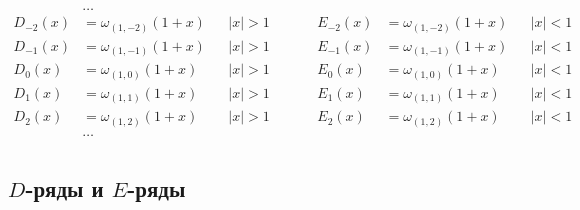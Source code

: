 \begin{equation*} \begin{aligned}
&\ldots \\
D_{-2}(x) &= \omega_{(1,-2)}(1 + x) &
&|x| > 1 &
&\quad &
E_{-2}(x) &= \omega_{(1,-2)}(1 + x) &
&|x| < 1 \\
%
D_{-1}(x) &= \omega_{(1,-1)}(1 + x) &
&|x| > 1 &
&\quad &
E_{-1}(x) &= \omega_{(1,-1)}(1 + x) &
&|x| < 1 \\
%
D_0(x) &= \omega_{(1,0)}(1 + x) &
&|x| > 1 &
&\quad &
E_0(x) &= \omega_{(1,0)}(1 + x) &
&|x| < 1 \\
%
D_1(x) &= \omega_{(1,1)}(1 + x) &
&|x| > 1 &
&\quad &
E_1(x) &= \omega_{(1,1)}(1 + x) &
&|x| < 1 \\
%
D_2(x) &= \omega_{(1,2)}(1 + x) &
&|x| > 1 &
&\quad &
E_2(x) &= \omega_{(1,2)}(1 + x) &
&|x| < 1 \\
%
&\ldots \\
\end{aligned} \end{equation*}

\subsection{$D$-ряды и $E$-ряды}

